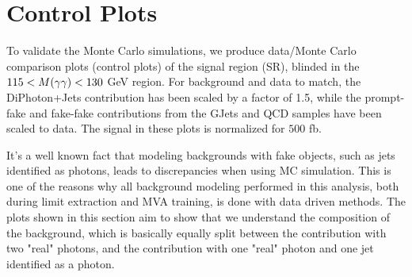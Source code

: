 \section{Control Plots}
\label{sec:control}

To validate the Monte Carlo simulations, we produce data/Monte Carlo comparison plots (control plots) of the signal region (SR), blinded in the $115 < M(\gamma\gamma) < 130$ GeV region.  
For background and data to match, the DiPhoton+Jets contribution has been scaled by a factor of 1.5, while the prompt-fake and fake-fake contributions from the GJets and QCD samples have been scaled to data. 
The signal in these plots is normalized for $500$ fb.

It's a well known fact that modeling backgrounds with fake objects, such as jets identified as photons, leads to discrepancies when using MC simulation. 
This is one of the reasons why all background modeling performed in this analysis, both during limit extraction and MVA training, is done with data driven methods. 
The plots shown in this section aim to show that we understand the composition of the background, which is basically equally split between the contribution with two "real" photons, and the contribution with one "real" photon and one jet identified as a photon.


